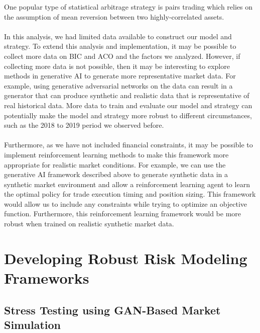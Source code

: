 One popular type of statistical arbitrage strategy is pairs trading which relies on the assumption of mean reversion between two highly-correlated assets.
\\ \\
In this analysis, we had limited data available to construct our model and strategy. To extend this analysis and implementation, it may be possible to collect more data on BIC and ACO and the factors we analyzed. However, if collecting more data is not possible, then it may be interesting to explore methods in generative AI to generate more representative market data. For example, using generative adversarial networks on the data can result in a generator that can produce synthetic and realistic data that is representative of real historical data. More data to train and evaluate our model and strategy can potentially make the model and strategy more robust to different circumstances, such as the 2018 to 2019 period we observed before.
\\ \\
Furthermore, as we have not included financial constraints, it may be possible to implement reinforcement learning methods to make this framework more appropriate for realistic market conditions. For example, we can use the generative AI framework described above to generate synthetic data in a synthetic market environment and allow a reinforcement learning agent to learn the optimal policy for trade execution timing and position sizing. This framework would allow us to include any constraints while trying to optimize an objective function. Furthermore, this reinforcement learning framework would be more robust when trained on realistic synthetic market data.

\section{Developing Robust Risk Modeling Frameworks}

\subsection{Stress Testing using GAN-Based Market Simulation}


